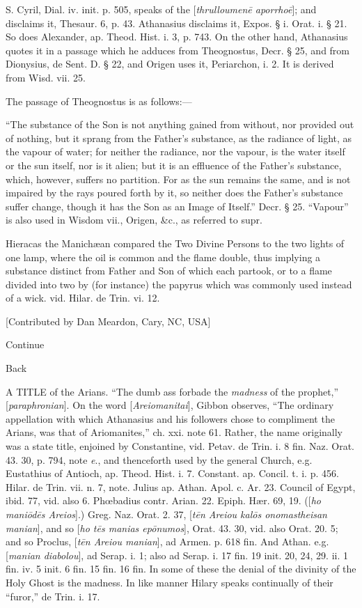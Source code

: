 S. Cyril, Dial. iv. init. p. 505, speaks of the [\emph{thrulloumen\={e}
aporrho\={e}}]; and disclaims it, Thesaur. 6, p. 43. Athanasius
disclaims it, Expos. § i. Orat. i. § 21. So does Alexander, ap.
Theod. Hist. i. 3, p. 743. On the other hand, Athanasius quotes it in
a passage which he adduces from Theognostus, Decr. § 25, and from
Dionysius, de Sent. D. § 22, and Origen uses it, Periarchon, i. 2. It
is derived from Wisd. vii. 25.

The passage of Theognostus is as follows:—

``The substance of the Son is not anything gained
from without, nor provided out of nothing, but it sprang from
the Father's substance, as the radiance of light, as the vapour of
water; for neither the radiance, nor the vapour, is the water itself
or the sun itself, nor is it alien; but it is an effluence of the
Father's substance, which, however, suffers no partition. For as the
sun remains the same, and is not impaired by the rays poured forth by
it, so neither does the Father's substance suffer change, though it
has the Son as an Image of Itself.'' Decr. § 25. ``Vapour'' is also used
in Wisdom vii., Origen, \&c., as referred to supr.

Hieracas the Manichæan compared the Two Divine
Persons to the two lights of one lamp, where the oil is common and the
flame double, thus implying a substance distinct from Father and Son
of which each partook, or to a flame divided into two by (for
instance) the papyrus which was commonly used instead of a wick. vid.
Hilar. de Trin. vi. 12.

[Contributed by Dan Meardon, Cary, NC, USA]

Continue

Back

\xsection{[Areiomanitai]}

A TITLE of the Arians. “The dumb ass forbade the \emph{madness}
of the prophet,” [\emph{paraphronian}]. On the word [\emph{Areiomanitai}],
Gibbon observes, “The ordinary appellation with which Athanasius and
his followers chose to compliment the Arians, was that of Ariomanites,”
ch. xxi. note 61. Rather, the name originally was a state title,
enjoined by Constantine, vid. Petav. de Trin. i. 8 fin. Naz. Orat. 43.
30, p. 794, note \emph{e}., and thenceforth used by the general
Church, e.g. Eustathius of Antioch, ap. Theod. Hist. i. 7. Constant.
ap. Concil. t. i. p. 456. Hilar. de Trin. vii. n. 7, note. Julius ap.
Athan. Apol. c. Ar. 23. Council of Egypt, ibid. 77, vid. also 6. Phœbadius
contr. Arian. 22. Epiph. Hær. 69, 19. ([\emph{ho mani\={o}d\={e}s
Areios}].) Greg. Naz. Orat. 2. 37, [\emph{t\={e}n Areiou kal\={o}s
onomastheisan manian}], and so [\emph{ho t\={e}s manias ep\={o}numos}],
Orat. 43. 30, vid. also Orat. 20. 5; and so Proclus, [\emph{t\={e}n
Areiou manian}], ad Armen. p. 618 fin. And Athan. e.g. [\emph{manian
diabolou}], ad Serap. i. 1; also ad Serap. i. 17 fin. 19 init. 20,
24, 29. ii. 1 fin. iv. 5 init. 6 fin. 15 fin. 16 fin. In some of these
the denial of the divinity of the Holy Ghost is the madness. In like
manner Hilary speaks continually of their “furor,” de Trin. i. 17.

